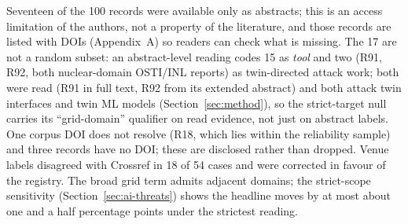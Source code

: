 \documentclass[preprint,12pt]{elsarticle}
\renewcommand{\_}{\plainunderscore\allowbreak}
\begin{document}
Seventeen of the 100 records were available only as abstracts; this is an access limitation
of the authors, not a property of the literature, and those records are listed with DOIs
(Appendix~A) so readers can check what is missing. The 17 are not a random subset: an
abstract-level reading codes 15 as \emph{tool} and two (R91, R92, both nuclear-domain
OSTI/INL reports) as twin-directed attack work; both were read (R91 in full text, R92 from its extended
abstract) and both attack twin interfaces and
twin ML models (Section~\ref{sec:method}), so the strict-target null carries its
``grid-domain'' qualifier on read evidence, not just on abstract labels. One
corpus DOI does not resolve (R18, which lies within the reliability sample) and three
records have no DOI; these are disclosed rather than dropped. Venue labels disagreed with
Crossref in 18 of 54 cases and were corrected in favour of the registry. The broad grid term
admits adjacent domains; the strict-scope sensitivity (Section~\ref{sec:ai-threats}) shows the
headline moves by at most about one and a half percentage points under the strictest reading.
\end{document}
